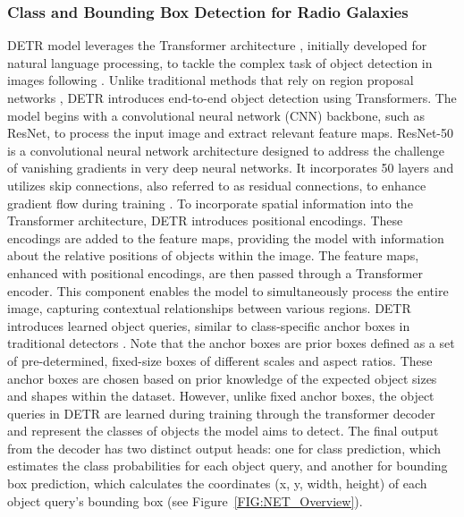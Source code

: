 \documentclass[
  journal=pasa,
  manuscript=research-paper, %
  year=2020,
  volume=37,
]{cup-journal}
\begin{document}
\subsubsection{Class and Bounding Box Detection for Radio Galaxies}
DETR model leverages the Transformer architecture \citep[][]{vaswani2017attention}, initially developed for natural language processing, to tackle the complex task of object detection in images following \citep[][]{dosovitskiy2020image}. 
Unlike traditional methods that rely on region proposal networks \citep[e.g. Faster RCNN;][]{ren2015faster}, DETR introduces end-to-end object detection using Transformers.
The model begins with a convolutional neural network (CNN) backbone, such as ResNet, to process the input image and extract relevant feature maps.
ResNet-50 is a convolutional neural network architecture designed to address the challenge of vanishing gradients in very deep neural networks. It incorporates 50 layers and utilizes skip connections, also referred to as residual connections, to enhance gradient flow during training \citep{he15d}.
To incorporate spatial information into the Transformer architecture, DETR introduces positional encodings. These encodings are added to the feature maps, providing the model with information about the relative positions of objects within the image.
The feature maps, enhanced with positional encodings, are then passed through a Transformer encoder. This component enables the model to simultaneously process the entire image, capturing contextual relationships between various regions.
DETR introduces learned object queries, similar to class-specific anchor boxes in traditional detectors \citep[e.g.][]{tian2019fcos}. 
Note that the anchor boxes are prior boxes defined as a set of pre-determined, fixed-size boxes of different scales and aspect ratios. These anchor boxes are chosen based on prior knowledge of the expected object sizes and shapes within the dataset. 
However, unlike fixed anchor boxes, the object queries in DETR are learned during training through the transformer decoder and represent the classes of objects the model aims to detect.
The final output from the decoder has two distinct output heads: one for class prediction, which estimates the class probabilities for each object query, and another for bounding box prediction, which calculates the coordinates (x, y, width, height) of each object query's bounding box (see Figure~\ref{FIG:NET_Overview}).
\end{document}
